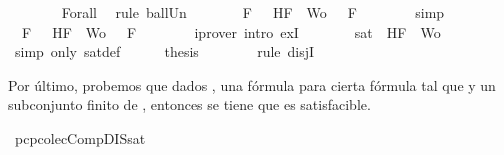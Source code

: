 \begin{isabellebody}
\ \ \ \ \ \ \isamarkupfalse%
\ Forall{}\ \isamarkupfalse%
\ {\isacharparenleft}rule\ ball{\isacharunderscore}Un{\isacharparenright}\isanewline
\ \ \ \ \isamarkupfalse%
\ \isamarkupfalse%
\ {\isachardoublequoteopen}{\isasymforall}F\ {\isasymin}\ {\isacharbraceleft}\isactrlbold {\isasymnot}\ H{\isacharcomma}F{\isacharbraceright}\ {\isasymunion}\ Wo{\isachardot}\ {\isasymA}\ {\isasymTurnstile}\ F{\isachardoublequoteclose}\isanewline
\ \ \ \ \ \ \isamarkupfalse%
\ simp\isanewline
\ \ \ \ \isamarkupfalse%
\ \isamarkupfalse%
\ {\isachardoublequoteopen}{\isasymexists}{\isasymA}{\isachardot}\ {\isasymforall}F\ {\isasymin}\ {\isacharparenleft}{\isacharbraceleft}\isactrlbold {\isasymnot}\ H{\isacharcomma}F{\isacharbraceright}\ {\isasymunion}\ Wo{\isacharparenright}{\isachardot}\ {\isasymA}\ {\isasymTurnstile}\ F{\isachardoublequoteclose}\isanewline
\ \ \ \ \ \ \isamarkupfalse%
\ {\isacharparenleft}iprover\ intro{\isacharcolon}\ exI{\isacharparenright}\isanewline
\ \ \ \ \isamarkupfalse%
\ \isamarkupfalse%
\ {\isachardoublequoteopen}sat\ {\isacharparenleft}{\isacharbraceleft}\isactrlbold {\isasymnot}\ H{\isacharcomma}F{\isacharbraceright}\ {\isasymunion}\ Wo{\isacharparenright}{\isachardoublequoteclose}\isanewline
\ \ \ \ \ \ \isamarkupfalse%
\ {\isacharparenleft}simp\ only{\isacharcolon}\ sat{\isacharunderscore}def{\isacharparenright}\isanewline
\ \ \ \ \isamarkupfalse%
\ {\isacharquery}thesis\isanewline
\ \ \ \ \ \ \isamarkupfalse%
\ {\isacharparenleft}rule\ disjI{}{\isacharparenright}\isanewline
\ \ \isamarkupfalse%
\isanewline
{}\isamarkupfalse%
%
\endisatagproof
{\isafoldproof}%
%
\isadelimproof
%
\endisadelimproof
%
\begin{isamarkuptext}%
Por último, probemos que dados , una fórmula  para cierta fórmula  tal 
  que  y  un subconjunto finito de , entonces se tiene que  es 
  satisfacible.%
\end{isamarkuptext}\isamarkuptrue%
\isamarkupfalse%
\ pcp{\isacharunderscore}colecComp{\isacharunderscore}DIS{\isacharunderscore}sat{}{\isacharcolon}\isanewline

\end{isabellebody}
